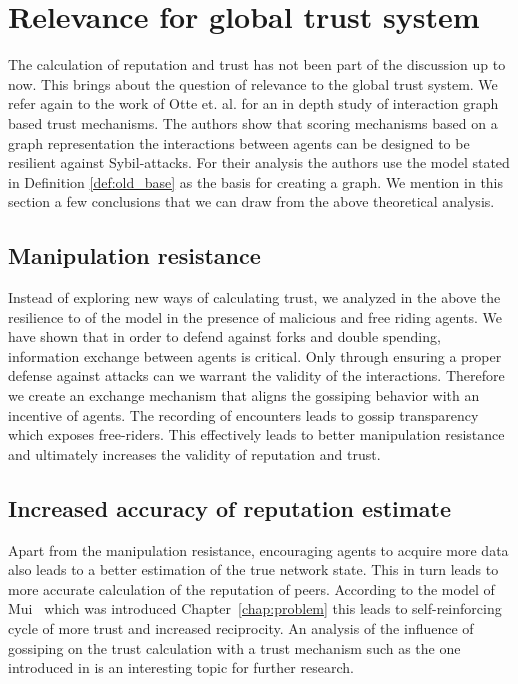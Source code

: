 \section{Relevance for global trust system}
The calculation of reputation and trust has not been part of the discussion up to now.
This brings about the question of relevance to the global trust system. We refer again to the work
of Otte et. al. \cite{OTTE2017} for an in depth study of interaction graph based trust mechanisms.
The authors show that scoring mechanisms based on a graph representation the interactions between 
agents can be designed to be resilient against Sybil-attacks. For their analysis the authors use the
model stated in Definition \ref{def:old_base} as the basis for creating a graph. We mention in this
section a few conclusions that we can draw from the above theoretical analysis.

\subsection{Manipulation resistance}
Instead of exploring new ways of calculating trust, we analyzed in the above the resilience to of 
the model in the presence of malicious and free riding agents. We have shown that in order to defend
against forks and double spending, information exchange between agents is critical. Only through
ensuring a proper defense against attacks can we warrant the validity of the interactions. Therefore
we create an exchange mechanism that aligns the gossiping behavior with an incentive of agents. The
recording of encounters leads to gossip transparency which exposes free-riders. This effectively 
leads to better manipulation resistance and ultimately increases the validity of reputation and 
trust.

\subsection{Increased accuracy of reputation estimate}
Apart from the manipulation resistance, encouraging agents to acquire more data also leads to a
better estimation of the true network state. This in turn leads to more accurate calculation of 
the reputation of peers. According to the model of Mui~\cite{mui2002computational} which was 
introduced Chapter~\ref{chap:problem} this leads to self-reinforcing cycle of more trust and 
increased reciprocity. An analysis of the influence of gossiping on the trust calculation with a
trust mechanism such as the one introduced in \cite{OTTE2017} is an interesting topic for further 
research.


